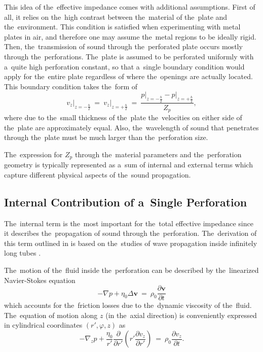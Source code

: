 This idea of the~effective impedance comes with additional assumptions.
First of all, it relies on the~high contrast between the~material of the~plate and the~environment.
This condition is satisfied when experimenting with metal plates in air, and therefore one may assume the~metal regions to be ideally rigid.
Then, the~transmission of sound through the~perforated plate occurs mostly through the~perforations.
The~plate is assumed to be perforated uniformly with a~quite high perforation constant, so that a~single boundary condition would apply for the~entire plate regardless of where the~openings are actually located.
This boundary condition takes the~form of
\begin{equation}
\label{eq:bcChain}
\left.v_z\right|_{z=-\frac{h}{2}}~=~\left.v_z\right|_{z=+\frac{h}{2}}~=~\frac{\left.p\right|_{z=-\frac{h}{2}}-\left.p\right|_{z=+\frac{h}{2}}}{Z_p},
\end{equation}
where due to the~small thickness of the~plate the~velocities on either side of the~plate are approximately equal.
Also, the~wavelength of sound that penetrates through the~plate must be much larger than the~perforation size.

The~expression for $Z_p$ through the~material parameters and the~perforation geometry is typically represented as a~sum of internal and external terms which capture different physical aspects of the~sound propagation.


\subsection{Internal Contribution of a~Single Perforation}

The~internal term is the~most important for the~total effective impedance since it describes the~propagation of sound through the~perforation.
The~derivation of this term outlined in \cite{maa} is based on the~studies of wave propagation inside infinitely long tubes \cite{rayleigh2}.

The~motion of the~fluid inside the~perforation can be described by the~linearized Navier-Stokes equation
\begin{equation}
-\nabla p + \eta_0 \Delta \mathbf{v}~=~\rho_0\frac{\partial \mathbf{v}}{\partial t}
\end{equation}
which accounts for the~friction losses due to the~dynamic viscosity of the~fluid.
The~equation of motion along $z$ (in the~axial direction) is conveniently expressed in cylindrical coordinates $(r',\varphi,z)$ as
\begin{equation}
-\nabla_z p+\frac{\eta_0}{r'}\frac{\partial}{\partial r'} \left(r' \frac{\partial v_z}{\partial r'}\right)~=~\rho_0 \frac{\partial v_z}{\partial t}.
\end{equation}

